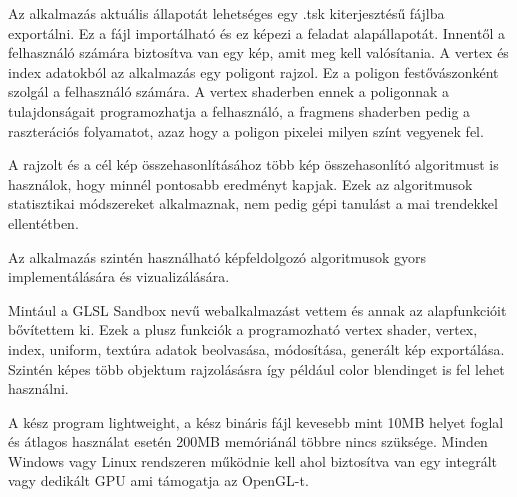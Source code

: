 Az alkalmazás aktuális állapotát lehetséges egy .tsk kiterjesztésű fájlba exportálni. Ez a fájl importálható és ez képezi a feladat alapállapotát. Innentől a felhasználó számára biztosítva van egy kép, amit meg kell valósítania. A vertex és index adatokból az alkalmazás egy poligont rajzol. Ez a poligon festővászonként szolgál a felhasználó számára. A vertex shaderben ennek a poligonnak a tulajdonságait programozhatja a felhasználó, a fragmens shaderben pedig a raszterációs folyamatot, azaz hogy a poligon pixelei milyen színt vegyenek fel.

A rajzolt és a cél kép összehasonlításához több kép összehasonlító algoritmust is használok, hogy minnél pontosabb eredményt kapjak. Ezek az algoritmusok statisztikai módszereket alkalmaznak, nem pedig gépi tanulást a mai trendekkel ellentétben.

Az alkalmazás szintén használható képfeldolgozó algoritmusok gyors implementálására és vizualizálására.

Mintául a GLSL Sandbox nevű webalkalmazást vettem és annak az alapfunkcióit bővítettem ki. Ezek a plusz funkciók a programozható vertex shader, vertex, index, uniform, textúra adatok beolvasása, módosítása, generált kép exportálása. Szintén képes több objektum rajzolásásra így például color blendinget is fel lehet használni.

A kész program lightweight, a kész bináris fájl kevesebb mint 10MB helyet foglal és átlagos használat esetén 200MB memóriánál többre nincs szüksége. Minden Windows vagy Linux rendszeren működnie kell ahol biztosítva van egy integrált vagy dedikált GPU ami támogatja az OpenGL-t.